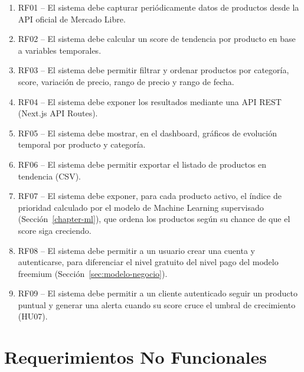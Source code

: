 \begin{enumerate}
	\item RF01 -- El sistema debe capturar periódicamente datos de productos desde la API oficial de Mercado Libre.
	\item RF02 -- El sistema debe calcular un score de tendencia por producto en base a variables temporales.
	\item RF03 -- El sistema debe permitir filtrar y ordenar productos por categoría, score, variación de precio, rango de precio y rango de fecha.
	\item RF04 -- El sistema debe exponer los resultados mediante una API REST (Next.js API Routes).
	\item RF05 -- El sistema debe mostrar, en el dashboard, gráficos de evolución temporal por producto y categoría.
	\item RF06 -- El sistema debe permitir exportar el listado de productos en tendencia (CSV).
	\item RF07 -- El sistema debe exponer, para cada producto activo, el índice de prioridad calculado por el modelo de Machine Learning supervisado (Sección~\ref{chapter-ml}), que ordena los productos según su chance de que el score siga creciendo.
	\item RF08 -- El sistema debe permitir a un usuario crear una cuenta y autenticarse, para diferenciar el nivel gratuito del nivel pago del modelo freemium (Sección~\ref{sec:modelo-negocio}).
	\item RF09 -- El sistema debe permitir a un cliente autenticado seguir un producto puntual y generar una alerta cuando su score cruce el umbral de crecimiento (HU07).
\end{enumerate}

\section{Requerimientos No Funcionales}

